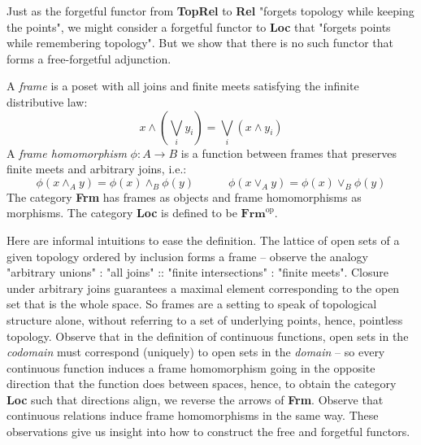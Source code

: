 \begin{fullwidth}

Just as the forgetful functor from \textbf{TopRel} to \textbf{Rel} "forgets topology while keeping the points", we might consider a forgetful functor to \textbf{Loc} that "forgets points while remembering topology". But we show that there is no such functor that forms a free-forgetful adjunction.

\begin{rem}
A \emph{frame} is a poset with all joins and finite meets satisfying the infinite distributive law:
\[x \wedge (\bigvee\limits_{i}y_i) = \bigvee\limits_{i}(x \wedge y_i)\]
A \emph{frame homomorphism} $\phi: A \rightarrow B$ is a function between frames that preserves finite meets and arbitrary joins, i.e.:
\[\phi(x \wedge_A y) = \phi(x) \wedge_B \phi(y) \quad \quad \quad \phi(x \vee_A y) = \phi(x) \vee_B \phi(y)\]
The category \textbf{Frm} has frames as objects and frame homomorphisms as morphisms. The category \textbf{Loc} is defined to be $\textbf{Frm}^\text{op}$.
\end{rem}

\begin{remark}
Here are informal intuitions to ease the definition. The lattice of open sets of a given topology ordered by inclusion forms a frame -- observe the analogy "arbitrary unions" : "all joins" :: "finite intersections" : "finite meets". Closure under arbitrary joins guarantees a maximal element corresponding to the open set that is the whole space. So frames are a setting to speak of topological structure alone, without referring to a set of underlying points, hence, pointless topology. Observe that in the definition of continuous functions, open sets in the \emph{codomain} must correspond (uniquely) to open sets in the \emph{domain} -- so every continuous function induces a frame homomorphism going in the opposite direction that the function does between spaces, hence, to obtain the category \textbf{Loc} such that directions align, we reverse the arrows of \textbf{Frm}. Observe that continuous relations induce frame homomorphisms in the same way. These observations give us insight into how to construct the free and forgetful functors.
\end{remark}


\end{fullwidth}
